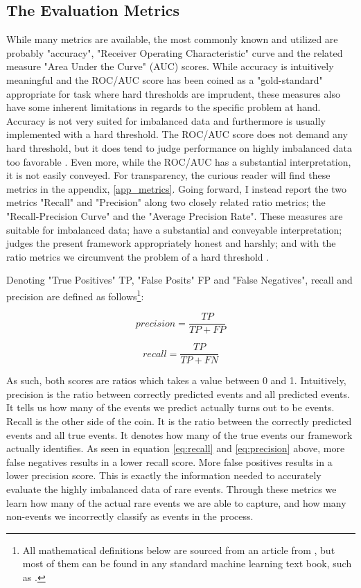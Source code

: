 \documentclass[a4paper]{article}
\begin{document}
\subsection{The Evaluation Metrics}

While many metrics are available, the most commonly known and utilized are probably "accuracy", "Receiver Operating Characteristic" curve and the related measure "Area Under the Curve" (AUC) scores. While accuracy is intuitively meaningful and the ROC/AUC score has been coined as a "gold-standard" \citep[366]{perry_2013} appropriate for task where hard thresholds are imprudent\citep[1277-1278]{He_2008}, these measures also have some inherent limitations in regards to the specific problem at hand. Accuracy is not very suited for imbalanced data \citep[1264]{He_2008} and furthermore is usually implemented with a hard threshold. The ROC/AUC score does not demand any hard threshold, but it does tend to judge performance on highly imbalanced data too favorable \citep[1278]{He_2008}. Even more, while the ROC/AUC has a substantial interpretation, it is not easily conveyed. For transparency, the curious reader will find these metrics in the appendix, \autoref{app_metrics}. Going forward, I instead report the two metrics "Recall" and "Precision" along two closely related ratio metrics; the "Recall-Precision Curve" and the "Average Precision Rate". These measures are suitable for imbalanced data; have a substantial and conveyable interpretation; judges the present framework appropriately honest and harshly; and with the ratio metrics we circumvent the problem of a hard threshold \cite[1278]{He_2008}.

Denoting "True Positives" TP, "False Posits" FP and "False Negatives", recall and precision are defined as follows\footnote{All mathematical definitions below are sourced from an article from \cite{He_2008}, but most of them can be found in any standard machine learning text book, such as \cite{Friedman_2001}.}:

\[
precision = \frac{TP}{TP+FP} \tag{2} \label{eq:recall}
\]

\[
recall = \frac{TP}{TP+FN} \tag{3} \label{eq:precision}
\]

As such, both scores are ratios which takes a value between 0 and 1. Intuitively, precision is the ratio between correctly predicted events and all predicted events. It tells us how many of the events we predict actually turns out to be events. Recall is the other side of the coin. It is the ratio between the correctly predicted events and all true events. It denotes how many of the true events our framework actually identifies. As seen in equation \ref{eq:recall} and \ref{eq:precision} above, more false negatives results in a lower recall score. More false positives results in a lower precision score. This is exactly the information needed to accurately evaluate the highly imbalanced data of rare events. Through these metrics we learn how many of the actual rare events we are able to capture, and how many non-events we incorrectly classify as events in the process.\par 
\end{document}
